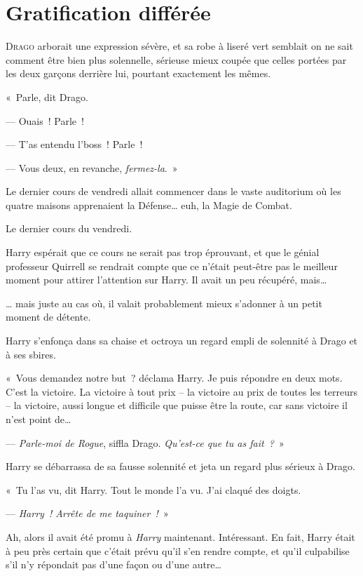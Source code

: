 
\chapter{Gratification différée}

\lettrine{D}{rago} arborait une expression sévère, et sa robe à liseré vert semblait on ne sait comment être bien plus solennelle, sérieuse mieux coupée que celles portées par les deux garçons derrière lui, pourtant exactement les mêmes.

«~Parle, dit Drago.

--- Ouais~!
Parle~!

--- T'as entendu l'boss~!
Parle~!

--- Vous deux, en revanche, \emph{fermez-la}.~»

Le dernier cours de vendredi allait commencer dans le vaste auditorium où les quatre maisons apprenaient la Défense… euh, la Magie de Combat.

Le dernier cours du vendredi.

Harry espérait que ce cours ne serait pas trop éprouvant, et que le génial professeur Quirrell se rendrait compte que ce n'était peut-être pas le meilleur moment pour attirer l'attention sur Harry.
Il avait un peu récupéré, mais…

… mais juste au cas où, il valait probablement mieux s'adonner à un petit moment de détente.

Harry s'enfonça dans sa chaise et octroya un regard empli de solennité à Drago et à ses sbires.

«~Vous demandez notre but~? déclama Harry.
Je puis répondre en deux mots.
C'est la victoire.
La victoire à tout prix -- la victoire au prix de toutes les terreurs -- la victoire, aussi longue et difficile que puisse être la route, car sans victoire il n'est point de…

--- \emph{Parle-moi de Rogue}, siffla Drago.
\emph{Qu'est-ce que tu as fait~?}~»

Harry se débarrassa de sa fausse solennité et jeta un regard plus sérieux à Drago.

«~Tu l'as vu, dit Harry.
Tout le monde l'a vu.
J'ai claqué des doigts.

--- \emph{Harry~!
Arrête de me taquiner~!}~»

Ah, alors il avait été promu à \emph{Harry} maintenant.
Intéressant.
En fait, Harry était à peu près certain que c'était prévu qu'il s'en rendre compte, et qu'il culpabilise s'il n'y répondait pas d'une façon ou d'une autre…

